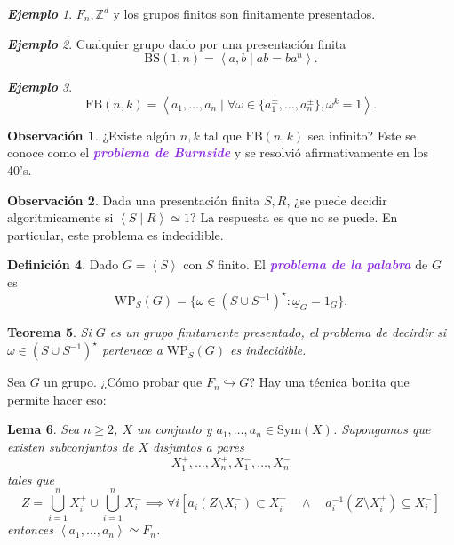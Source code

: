 \documentclass{article}
\newtheorem{theorem}{Teorema}[subsection]
\newtheorem{lemma}[theorem]{Lema}
\theoremstyle{definition}
\newtheorem{definition}[theorem]{Definición}
\newtheorem*{obs}{Observación}
\theoremstyle{remark}
\newtheorem{example}[theorem]{\textbf{Ejemplo}}
\numberwithin{equation}{section}
\newcommand{\Z}{\mathbb{Z}}
\newcommand{\w}{\omega}
\newcommand{\embed}{\hookrightarrow}
\newcommand{\Sym}{\mathrm{Sym}}
\newcommand{\cor}[1]{\left[ #1 \right]}
\newcommand{\gen}[1]{\left\langle #1 \right\rangle}
\newcommand{\wea}[1]{\textcolor{BlueViolet}{\textbf{\emph{#1}}}}
\begin{document}
\begin{example}
  $F_n, \Z^d$ y los grupos finitos son finitamente presentados.
\end{example}

\begin{example}
  Cualquier grupo dado por una presentación finita
  \[\mathrm{BS}(1,n) = \gen{a,b \mid ab=ba^n}.\]
\end{example}

\begin{example}
  $$\mathrm{FB}(n,k) = \gen{a_1,\dots,a_n \mid \forall \w \in \{a_1^\pm, \dots, a_n^\pm\}, \w^k = 1}.$$
\end{example}

\begin{obs}
  ¿Existe algún $n,k$ tal que $\mathrm{FB}(n,k)$ sea infinito? Este se conoce como el \wea{problema de Burnside} y se resolvió afirmativamente en los 40's.
\end{obs}

\begin{obs}
  Dada una presentación finita $S,R$, ¿se puede decidir algoritmicamente si $\gen{S \mid R} \simeq 1$? La respuesta es que no se puede. En particular, este problema es indecidible.
\end{obs}

\begin{definition}
  Dado $G = \gen{S}$ con $S$ finito. El \wea{problema de la palabra} de $G$ es
  \[\mathrm{WP}_S(G) = \{\w \in (S \cup S^{-1})^\star \colon \underline{\w}_G = 1_G\}.\]
\end{definition}

\begin{theorem}
  Si $G$ es un grupo finitamente presentado, el problema de decirdir si $\w \in (S \cup S^{-1})^\star$ pertenece a $\mathrm{WP}_S(G)$ es indecidible.
\end{theorem}

Sea $G$ un grupo. ¿Cómo probar que $F_n \embed G$? Hay una técnica bonita que permite hacer eso:

\begin{lemma}
  Sea $n \geq 2$, $X$ un conjunto y $a_1, \dots, a_n \in \Sym(X)$. Supongamos que existen subconjuntos de $X$ disjuntos a pares
  \[X_1^+, \dots, X_n^+, X_1^-, \dots, X_n^-\]
  tales que
  \[Z = \bigcup_{i=1}^n X_i^+ \cup \bigcup_{i=1}^n X_i^- \implies \forall i \cor{
    a_i (Z \setminus X_i^-) \subset X_i^+ \quad \land\quad a_i^{-1} (Z \setminus X_i^+) \subseteq X_i^-
  }\]
  entonces $\gen{a_1,\dots,a_n} \simeq F_n$.
\end{lemma}
\end{document}
